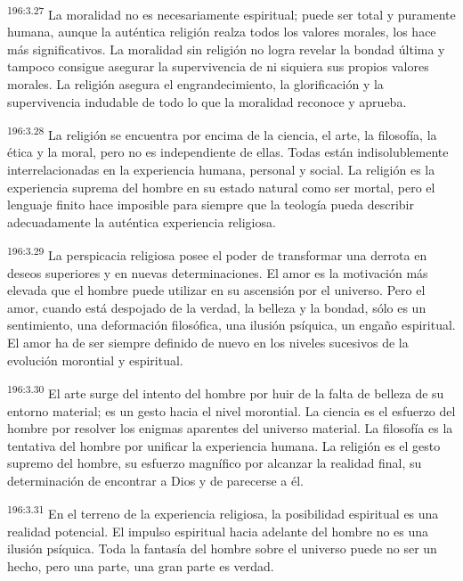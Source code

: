\par 
\textsuperscript{196:3.27} La moralidad no es necesariamente espiritual; puede ser total y puramente humana, aunque la auténtica religión realza todos los valores morales, los hace más significativos. La moralidad sin religión no logra revelar la bondad última y tampoco consigue asegurar la supervivencia de ni siquiera sus propios valores morales. La religión asegura el engrandecimiento, la glorificación y la supervivencia indudable de todo lo que la moralidad reconoce y aprueba.

\par 
\textsuperscript{196:3.28} La religión se encuentra por encima de la ciencia, el arte, la filosofía, la ética y la moral, pero no es independiente de ellas. Todas están indisolublemente interrelacionadas en la experiencia humana, personal y social. La religión es la experiencia suprema del hombre en su estado natural como ser mortal, pero el lenguaje finito hace imposible para siempre que la teología pueda describir adecuadamente la auténtica experiencia religiosa.

\par 
\textsuperscript{196:3.29} La perspicacia religiosa posee el poder de transformar una derrota en deseos superiores y en nuevas determinaciones. El amor es la motivación más elevada que el hombre puede utilizar en su ascensión por el universo. Pero el amor, cuando está despojado de la verdad, la belleza y la bondad, sólo es un sentimiento, una deformación filosófica, una ilusión psíquica, un engaño espiritual. El amor ha de ser siempre definido de nuevo en los niveles sucesivos de la evolución morontial y espiritual.

\par 
\textsuperscript{196:3.30} El arte surge del intento del hombre por huir de la falta de belleza de su entorno material; es un gesto hacia el nivel morontial. La ciencia es el esfuerzo del hombre por resolver los enigmas aparentes del universo material. La filosofía es la tentativa del hombre por unificar la experiencia humana. La religión es el gesto supremo del hombre, su esfuerzo magnífico por alcanzar la realidad final, su determinación de encontrar a Dios y de parecerse a él.

\par 
\textsuperscript{196:3.31} En el terreno de la experiencia religiosa, la posibilidad espiritual es una realidad potencial. El impulso espiritual hacia adelante del hombre no es una ilusión psíquica. Toda la fantasía del hombre sobre el universo puede no ser un hecho, pero una parte, una gran parte es verdad.


